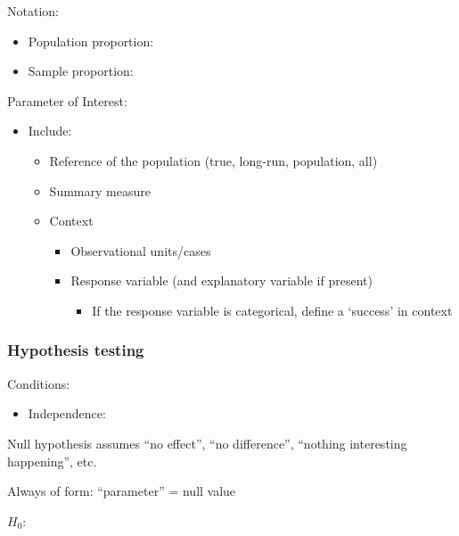 \documentclass[
]{report}
\providecommand{\tightlist}{%
  \setlength{\itemsep}{0pt}\setlength{\parskip}{0pt}}
\newcommand{\rgi}{\hspace{24pt}}  %
\begin{document}
Notation:

\begin{itemize}
\item
  Population proportion:
\item
  Sample proportion:
\end{itemize}

Parameter of Interest:

\begin{itemize}
\item
  Include:

  \begin{itemize}
  \item
    Reference of the population (true, long-run, population, all)
  \item
    Summary measure
  \item
    Context

    \begin{itemize}
    \item
      Observational units/cases
    \item
      Response variable (and explanatory variable if present)

      \begin{itemize}
      \tightlist
      \item
        If the response variable is categorical, define a `success' in context
      \end{itemize}
    \end{itemize}
  \end{itemize}
\end{itemize}

\subsubsection*{Hypothesis testing}\label{hypothesis-testing}

Conditions:

\begin{itemize}
\tightlist
\item
  Independence:
\end{itemize}

\vspace{0.3in}

Null hypothesis assumes ``no effect'', ``no difference'', ``nothing interesting happening'', etc.

\rgi Always of form: ``parameter'' = null value

\(H_0:\)
\end{document}
